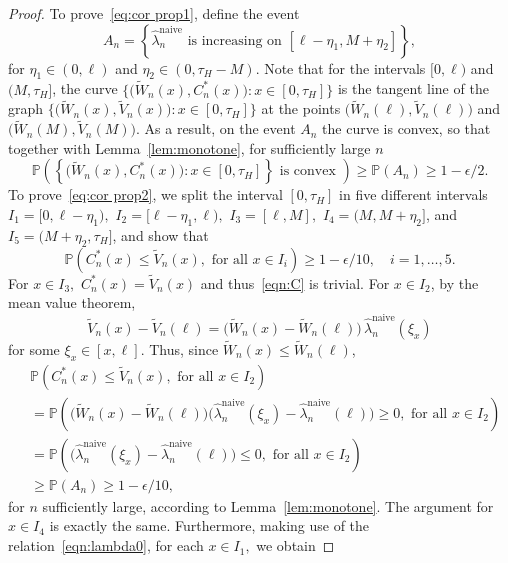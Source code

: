 \documentclass[11pt,reqno]{amsart}
\theoremstyle{definition}
\theoremstyle{plain}
\theoremstyle{remark}
\begin{document}
\begin{proof}
To prove~\eqref{eq:cor prop1}, define the event
\[
A_n=\left\{\hat{\lambda}_n^{\mathrm{naive}} \text{ is increasing on } [\ell-\eta_1,M+\eta_2]\right\},
\]
for $\eta_1\in(0,\ell)$ and $\eta_2\in(0,\tau_H-M)$.
Note that for the intervals $[0,\ell)$ and $(M,\tau_H]$,
the curve $\big\{\big(\tilde W_n(x),C^*_n(x)\big):x\in[0,\tau_H]\big\}$ is the tangent line of the graph $\big\{\big(\tilde W_n(x),\tilde V_n(x)\big):x\in[0,\tau_H]\big\}$
at the points $\big(\tilde W_n(\ell),\tilde V_n(\ell)\big)$ and $\big(\tilde W_n(M),\tilde V_n(M)\big)$.
As a result, on the event $A_n$ the curve is convex, so that together with Lemma~\ref{lem:monotone},
for sufficiently large $n$
\[
{\mathbb{P}}
\left(
\left\{
\big(\tilde W_n(x),C^*_n(x)\big):x\in[0,\tau_H]
\right\} \text{ is convex }
\right)
\geq
{\mathbb{P}}(A_n)
\geq
1-\epsilon/2.
\]
To prove~\eqref{eq:cor prop2}, we split the interval $[0,\tau_H]$ in five different intervals
$I_1=[0,\ell-\eta_1),$ $I_2=[\ell-\eta_1,\ell),$ $I_3=[\ell,M],$ $I_4=(M,M+\eta_2]$, and $I_5=(M+\eta_2,\tau_H]$,
and show that
\begin{equation}
\label{eqn:C}
{\mathbb{P}}
\left(
C^*_n(x)\leq \tilde V_n(x),\text{ for all }x\in I_i
\right)\geq 1-\epsilon/10,
\quad
i=1,\ldots,5.
\end{equation}
For $x\in I_3,$ $C^*_n(x)=\tilde V_n(x)$ and thus~\eqref{eqn:C} is trivial.
For $x\in I_2$, by the mean value theorem,
\[
\tilde V_n(x)-\tilde V_n(\ell)=\big(\tilde W_n(x)-\tilde W_n(\ell)\big)\,\hat{\lambda}_n^{\mathrm{naive}}(\xi_x)
\]
for some $\xi_x\in[x,\ell]$.
Thus, since $\tilde W_n(x)\leq\tilde W_n(\ell)$,
\begin{equation}
\label{eq:argument I2}
\begin{split}
&
{\mathbb{P}}
\left(
C^*_n(x)\leq \tilde V_n(x),\text{ for all }x\in I_2
\right)
\\
&=
{\mathbb{P}}
\left(
\big(\tilde W_n(x)-\tilde W_n(\ell)\big)
\big(\hat{\lambda}_n^{\mathrm{naive}}(\xi_x)-\hat{\lambda}_n^{\mathrm{naive}}(\ell)\big)\geq 0,
\text{ for all }x\in I_2
\right)\\
&=
{\mathbb{P}}
\left(
\big(\hat{\lambda}_n^{\mathrm{naive}}(\xi_x)-\hat{\lambda}_n^{\mathrm{naive}}(\ell)\big)\leq 0,
\text{ for all }x\in I_2\right)\\
&\geq
{\mathbb{P}}(A_n)\geq 1-\epsilon/10,
\end{split}
\end{equation}
for $n$ sufficiently large, according to Lemma~\ref{lem:monotone}.
The argument for $x\in I_4$ is exactly the same.
Furthermore, making use of the relation~\eqref{eqn:lambda0}, for each $x\in I_1,$ we obtain

\end{proof}
\end{document}
